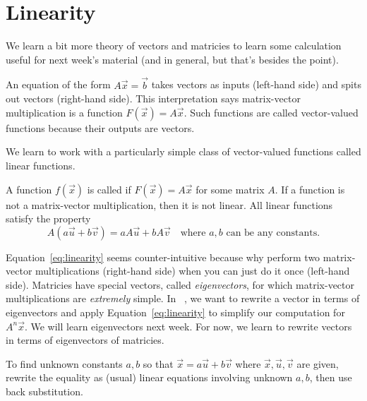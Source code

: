 \documentclass[../main.tex]{subfiles}
\begin{document}
 \section{Linearity}

We learn a bit more theory of vectors and matricies to learn some calculation useful for next week's material (and in general, but that's besides the point). 

An equation of the form \(A \vec{x} = \vec{b}\) takes vectors as inputs (left-hand side) and spits out vectors (right-hand side). This interpretation says matrix-vector multiplication is a function \(F(\vec{x}) = A \vec{x}\). Such functions are called vector-valued functions because their outputs are vectors.


We learn to work with a particularly simple class of vector-valued functions called linear functions.

\begin{definition}[linearity] \label{def:linearity}
  A function \(f(\vec{x})\) is called  if \(F(\vec{x}) = A\vec{x}\) for some matrix \(A\). If a function is not a matrix-vector multiplication, then it is not linear. All linear functions satisfy the property
  \begin{equation} \label{eq:linearity}
    A(a \vec{u} + b \vec{v}) = a A\vec{u} + b A\vec{v} \quad\text{where \(a,b\) can be any constants.}
  \end{equation}
\end{definition}

Equation~\eqref{eq:linearity} seems counter-intuitive because why perform two matrix-vector multiplications (right-hand side) when you can just do it once (left-hand side).  Matricies have special vectors, called \emph{eigenvectors}, for which matrix-vector multiplications are \emph{extremely} simple.  In \thecoursesubject{}~\thecoursenumb{}, we want to rewrite a vector in terms of eigenvectors and apply Equation~\ref{eq:linearity} to simplify our computation for \(A^{n} \vec{x}\). We will learn eigenvectors next week. For now, we learn to rewrite vectors in terms of eigenvectors of matricies.

\begin{method} \label{method:linear-combination}
  To find unknown constants \(a,b\) so that \(\vec{x} = a \vec{u} + b \vec{v}\) where \(\vec{x}, \vec{u}, \vec{v}\) are given, rewrite the equality as (usual) linear equations involving unknown \(a,b\), then use back substitution.
\end{method}
\end{document}
